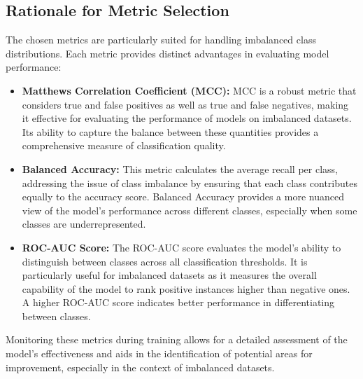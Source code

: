 \documentclass[10pt,twocolumn,letterpaper]{article}
\begin{document}
\subsection{Rationale for Metric Selection}

The chosen metrics are particularly suited for handling imbalanced class distributions. Each metric provides distinct advantages in evaluating model performance:

\begin{itemize}
    \item \textbf{Matthews Correlation Coefficient (MCC):} MCC is a robust metric that considers true and false positives as well as true and false negatives, making it effective for evaluating the performance of models on imbalanced datasets. 
    Its ability to capture the balance between these quantities provides a comprehensive measure of classification quality.
    \item \textbf{Balanced Accuracy:} This metric calculates the average recall per class, addressing the issue of class imbalance by ensuring that each class contributes equally to the accuracy score. 
    Balanced Accuracy provides a more nuanced view of the model's performance across different classes, especially when some classes are underrepresented.
    \item \textbf{ROC-AUC Score:} The ROC-AUC score evaluates the model's ability to distinguish between classes across all classification thresholds. 
    It is particularly useful for imbalanced datasets as it measures the overall capability of the model to rank positive instances higher than negative ones. A higher ROC-AUC score indicates better performance in differentiating between classes.
\end{itemize}

Monitoring these metrics during training allows for a detailed assessment of the model's effectiveness and aids in the identification of potential areas for improvement, especially in the context of imbalanced datasets.
\end{document}

